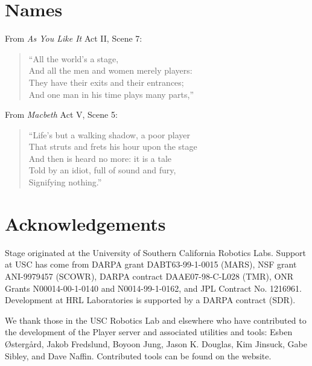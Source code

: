 \documentclass[11pt]{report}
\begin{document}
  \section{Names}
    
    From {\sl As You Like It} Act II, Scene 7:
    \begin{quote}
    ``All the world's a stage, \\
    And all the men and women merely players: \\
    They have their exits and their entrances; \\
    And one man in his time plays many parts,''\\
    \end{quote}

    From {\sl Macbeth} Act V, Scene 5:
    \begin{quote}
    ``Life's but a walking shadow, a poor player \\
    That struts and frets his hour upon the stage \\
    And then is heard no more: it is a tale \\
    Told by an idiot, full of sound and fury, \\
    Signifying nothing.''\\
    \end{quote}

  \section{Acknowledgements}

Stage originated at the University of Southern California Robotics
    Labs. Support at USC has come from DARPA grant DABT63-99-1-0015
    (MARS), NSF grant ANI-9979457 (SCOWR), DARPA contract
    DAAE07-98-C-L028 (TMR), ONR Grants N00014-00-1-0140 and
    N0014-99-1-0162, and JPL Contract No. 1216961. Development at HRL
    Laboratories is supported by a DARPA contract (SDR).

We thank those in the USC Robotics Lab and elsewhere who have
contributed to the development of the Player server and associated
utilities and tools: Esben \O{}sterg\aa{}rd, Jakob Fredslund, Boyoon
Jung, Jason K. Douglas, Kim Jinsuck, Gabe Sibley, and Dave
Naffin. Contributed tools can be found on the website.
\end{document}
